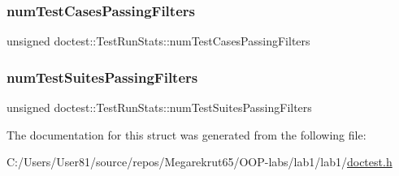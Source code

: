 \subsubsection{\texorpdfstring{num\+Test\+Cases\+Passing\+Filters}{numTestCasesPassingFilters}}
{\footnotesize\ttfamily unsigned doctest\+::\+Test\+Run\+Stats\+::num\+Test\+Cases\+Passing\+Filters}

\mbox{\label{structdoctest_1_1_test_run_stats_aecbf62d51a6c96875d72124c27096e1d}} 
\subsubsection{\texorpdfstring{num\+Test\+Suites\+Passing\+Filters}{numTestSuitesPassingFilters}}
{\footnotesize\ttfamily unsigned doctest\+::\+Test\+Run\+Stats\+::num\+Test\+Suites\+Passing\+Filters}



The documentation for this struct was generated from the following file\+:\begin{DoxyCompactItemize}
\item 
C\+:/\+Users/\+User81/source/repos/\+Megarekrut65/\+O\+O\+P-\/labs/lab1/lab1/\mbox{\hyperlink{doctest_8h}{doctest.\+h}}\end{DoxyCompactItemize}
